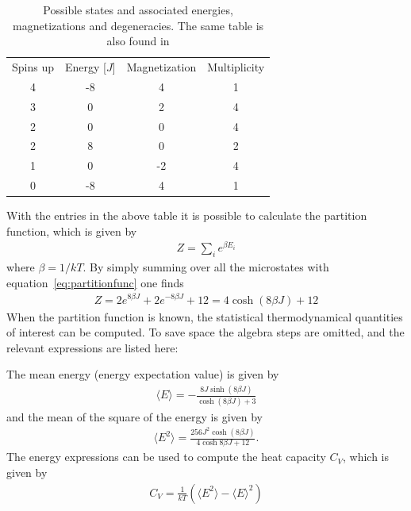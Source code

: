 \documentclass[aps,reprint]{revtex4-1}
\newcommand{\mean}[1]{\langle #1 \rangle}
\begin{document}
\begin{table}[H]
  \caption{Possible states and associated energies, magnetizations and degeneracies.
  The same table is also found in \cite{mortenjensen}}
  \label{tab:2x2values}
  \begin{ruledtabular}
    \begin{tabular}{cccc}
      Spins up & Energy [$J$] & Magnetization & Multiplicity \\
      4        & -8           & 4             & 1            \\
      3        & 0            & 2             & 4            \\
      2        & 0            & 0             & 4            \\
      2        & 8            & 0             & 2            \\
      1        & 0            & -2            & 4            \\
      0        & -8           & 4             & 1
    \end{tabular}
  \end{ruledtabular}
\end{table}
With the entries in the above table it is possible to calculate the partition
function, which is given by
\begin{align} \label{eq:partitionfunc}
  Z = \sum_i e^{\beta E_i}
\end{align}
where $\beta = 1/kT$. By simply summing over all the microstates with equation~\ref{eq:partitionfunc}
one finds
\begin{align*}
  Z = 2 e^{8\beta J} + 2 e^{- 8\beta J} + 12 = 4 \cosh{(8\beta J)} + 12
\end{align*}
When the partition function is known, the statistical thermodynamical quantities
of interest can be computed. To save space the algebra steps are omitted,
and the relevant expressions are listed here:

The mean energy (energy expectation value) is given by
\begin{align*}
  \mean{E} = -\frac{8 J \sinh{(8\beta J)}}{\cosh{(8\beta J)} + 3}
\end{align*}
and the mean of the square of the energy is given by
\begin{align*}
  \mean{E^2} = \frac{256 J^2 \cosh{(8\beta J)}}{4\cosh{8\beta J} + 12}.
\end{align*}
The energy expressions can be used to compute the heat capacity $C_V$, which
is given by
\begin{align*}
  C_V = \frac{1}{kT} \left( \mean{E^2} - \mean{E}^2 \right)
\end{align*}
\end{document}
